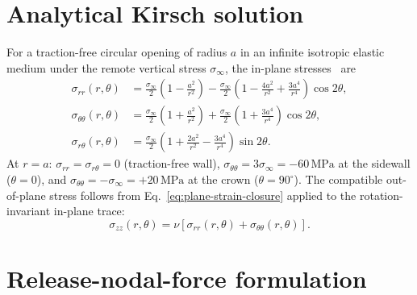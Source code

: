 \documentclass[11pt,a4paper]{tubaf-report}
\newcommand{\MPa}{\,\mathrm{MPa}}
\begin{document}
\section{Analytical Kirsch solution}
\label{sec:kirsch-analytical}

For a traction-free circular opening of radius $a$ in an infinite isotropic
elastic medium under the remote vertical stress $\sigma_\infty$, the in-plane
stresses~\cite{kirsch1898} are
\begin{align}
\sigma_{rr}(r,\theta)
 &= \frac{\sigma_\infty}{2}\left(1-\frac{a^2}{r^2}\right)
  - \frac{\sigma_\infty}{2}
    \left(1-\frac{4a^2}{r^2}+\frac{3a^4}{r^4}\right)\cos 2\theta,
  \label{eq:kirsch-rr}\\
\sigma_{\theta\theta}(r,\theta)
 &= \frac{\sigma_\infty}{2}\left(1+\frac{a^2}{r^2}\right)
  + \frac{\sigma_\infty}{2}
    \left(1+\frac{3a^4}{r^4}\right)\cos 2\theta,
  \label{eq:kirsch-tt}\\
\sigma_{r\theta}(r,\theta)
 &= \frac{\sigma_\infty}{2}
    \left(1+\frac{2a^2}{r^2}-\frac{3a^4}{r^4}\right)\sin 2\theta.
  \label{eq:kirsch-rt}
\end{align}
At $r=a$: $\sigma_{rr}=\sigma_{r\theta}=0$ (traction-free wall),
$\sigma_{\theta\theta}=3\sigma_\infty=-60\MPa$ at the sidewall
($\theta=0$), and $\sigma_{\theta\theta}=-\sigma_\infty=+20\MPa$ at the
crown ($\theta=90^\circ$). The compatible out-of-plane stress follows from
Eq.~\eqref{eq:plane-strain-closure} applied to the rotation-invariant
in-plane trace:
\begin{equation}
  \sigma_{zz}(r,\theta)
  =\nu\left[\sigma_{rr}(r,\theta)+\sigma_{\theta\theta}(r,\theta)\right].
  \label{eq:kirsch-zz}
\end{equation}

\section{Release-nodal-force formulation}
\end{document}
